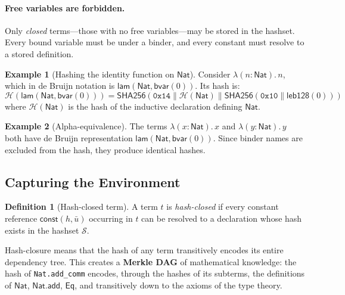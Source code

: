 \documentclass[11pt]{article}
\theoremstyle{definition}
\newtheorem{definition}{Definition}[section]
\newtheorem{example}{Example}[section]
\theoremstyle{plain}
\theoremstyle{remark}
\newcommand{\hash}{\mathcal{H}}
\newcommand{\hashset}{\mathcal{S}}
\newcommand{\SHA}{\textsf{SHA256}}
\newcommand{\Nat}{\textsf{Nat}}
\newcommand{\Eq}{\textsf{Eq}}
\newcommand{\bvar}{\textsf{bvar}}
\newcommand{\const}{\textsf{const}}
\newcommand{\lam}{\textsf{lam}}
\newcommand{\concat}{\mathbin{\|}}
\begin{document}
\paragraph{Free variables are forbidden.}
Only \emph{closed} terms---those with no free variables---may be stored in the hashset.
Every bound variable must be under a binder, and every constant must resolve to a stored definition.

\begin{example}[Hashing the identity function on $\Nat$]
\label{ex:identity}
Consider $\lambda(n{:}\Nat).\,n$, which in de Bruijn notation is $\lam(\Nat, \bvar(0))$.
Its hash is:
\[
  \hash(\lam(\Nat, \bvar(0))) = \SHA(\mathtt{0x14} \concat \hash(\Nat) \concat \SHA(\mathtt{0x10} \concat \textsf{leb128}(0)))
\]
where $\hash(\Nat)$ is the hash of the inductive declaration defining $\Nat$.
\end{example}

\begin{example}[Alpha-equivalence]
\label{ex:alpha}
The terms $\lambda(x{:}\Nat).\,x$ and $\lambda(y{:}\Nat).\,y$ both have de Bruijn representation
$\lam(\Nat, \bvar(0))$.
Since binder names are excluded from the hash, they produce identical hashes.
\end{example}

\subsection{Capturing the Environment}
\label{sec:hash-closure}

\begin{definition}[Hash-closed term]
A term $t$ is \emph{hash-closed} if every constant reference $\const(h, \bar{u})$ occurring
in $t$ can be resolved to a declaration whose hash exists in the hashset $\hashset$.
\end{definition}

Hash-closure means that the hash of any term transitively encodes its entire dependency tree.
This creates a \textbf{Merkle DAG} of mathematical knowledge: the hash of \texttt{Nat.add\_comm}
encodes, through the hashes of its subterms, the definitions of $\Nat$, $\Nat.\textsf{add}$, $\Eq$,
and transitively down to the axioms of the type theory.
\end{document}
